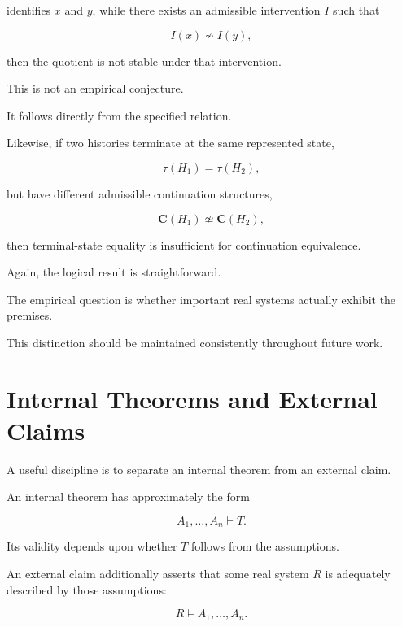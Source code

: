 \documentclass[11pt]{article}
\theoremstyle{remark}
\begin{document}
identifies $x$ and $y$, while there exists an admissible intervention $I$ such
that

\begin{equation}
I(x)\not\sim I(y),
\end{equation}

then the quotient is not stable under that intervention.

This is not an empirical conjecture.

It follows directly from the specified relation.

Likewise, if two histories terminate at the same represented state,

\begin{equation}
\tau(H_1)=\tau(H_2),
\end{equation}

but have different admissible continuation structures,

\begin{equation}
\mathbf{C}(H_1)\not\simeq\mathbf{C}(H_2),
\end{equation}

then terminal-state equality is insufficient for continuation equivalence.

Again, the logical result is straightforward.

The empirical question is whether important real systems actually exhibit the
premises.

This distinction should be maintained consistently throughout future work.

\section{Internal Theorems and External Claims}

A useful discipline is to separate an internal theorem from an external claim.

An internal theorem has approximately the form

\begin{equation}
A_1,\ldots,A_n
\vdash
T.
\end{equation}

Its validity depends upon whether $T$ follows from the assumptions.

An external claim additionally asserts that some real system $R$ is adequately
described by those assumptions:

\begin{equation}
R\models A_1,\ldots,A_n.
\end{equation}
\end{document}
